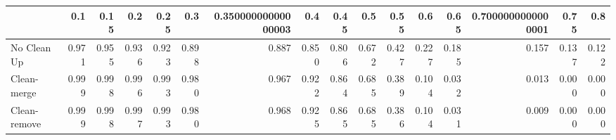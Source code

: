 \begin{tabular}{lrrrrrrrrrrrrrrr}
\toprule
{} &   0.1 &  0.15 &   0.2 &  0.25 &   0.3 & 0.35000000000000003 &   0.4 &  0.45 &   0.5 &  0.55 &   0.6 &  0.65 & 0.7000000000000001 &  0.75 &   0.8 \\
\midrule
No Clean Up  & 0.971 & 0.955 & 0.936 & 0.923 & 0.898 &               0.887 & 0.850 & 0.806 & 0.672 & 0.427 & 0.227 & 0.185 &              0.157 & 0.137 & 0.122 \\
Clean-merge  & 0.999 & 0.998 & 0.996 & 0.993 & 0.980 &               0.967 & 0.922 & 0.864 & 0.685 & 0.389 & 0.104 & 0.032 &              0.013 & 0.000 & 0.000 \\
Clean-remove & 0.999 & 0.998 & 0.997 & 0.993 & 0.980 &               0.968 & 0.925 & 0.865 & 0.685 & 0.386 & 0.104 & 0.031 &              0.009 & 0.000 & 0.000 \\
\bottomrule
\end{tabular}
